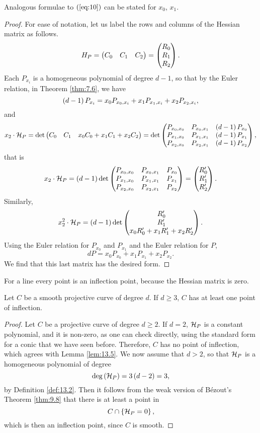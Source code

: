 \begin{remark}
Analogous formulae to $ \left( \ref{eq:10} \right) $ can be stated for $ x_0 $, $ x_1 $.
\end{remark}


\begin{proof}
For ease of notation, let us label the rows and columns of the Hessian matrix as follows.
$$ H_P = \begin{pmatrix} C_0 & C_1 & C_2 \end{pmatrix} = \begin{pmatrix} R_0 \\ R_1 \\ R_2 \end{pmatrix}.
$$
Each $ P_{x_i} $ is a homogeneous polynomial of degree $ d - 1 $, so that by the Euler relation, in Theorem \ref{thm:7.6}, we have
$$ \left( d - 1 \right)P_{x_i} = x_0P_{x_0, x_i} + x_1P_{x_1, x_i} + x_2P_{x_2, x_i}, $$
and
$$ x_2 \cdot \mathcal{H}_P = \det\begin{pmatrix} C_0 & C_1 & x_0C_0 + x_1C_1 + x_2C_2 \end{pmatrix} = \det\begin{pmatrix} P_{x_0, x_0} & P_{x_0, x_1} & \left( d - 1 \right)P_{x_0} \\ P_{x_1, x_0} & P_{x_1, x_1} & \left( d - 1 \right)P_{x_1} \\ P_{x_2, x_0} & P_{x_2, x_1} & \left( d - 1 \right)P_{x_2} \end{pmatrix}, $$
that is
$$ x_2 \cdot \mathcal{H}_P = \left( d - 1 \right)\det\begin{pmatrix} P_{x_0, x_0} & P_{x_0, x_1} & P_{x_0} \\ P_{x_1, x_0} & P_{x_1, x_1} & P_{x_1} \\ P_{x_2, x_0} & P_{x_2, x_1} & P_{x_2} \end{pmatrix} = \begin{pmatrix} R_0' \\ R_1' \\ R_2' \end{pmatrix}. $$
Similarly,
$$ x_2^2 \cdot \mathcal{H}_P = \left( d - 1 \right)\det\begin{pmatrix} R_0' \\ R_1' \\ x_0R_0' + x_1R_1' + x_2R_2' \end{pmatrix}. $$
Using the Euler relation for $ P_{x_0} $ and $ P_{x_1} $ and the Euler relation for $ P $,
$$ dP = x_0P_{x_0} + x_1P_{x_1} + x_2P_{x_2}. $$
We find that this last matrix has the desired form.
\end{proof}

\begin{note*}
For a line every point is an inflection point, because the Hessian matrix is zero.
\end{note*}

\begin{lemma}
\label{lem:13.5}
Let $ C $ be a smooth projective curve of degree $ d $. If $ d \ge 3 $, $ C $ has at least one point of inflection.
\end{lemma}

\begin{proof}
Let $ C $ be a projective curve of degree $ d \ge 2 $. If $ d = 2 $, $ \mathcal{H}_P $ is a constant polynomial, and it is non-zero, as one can check directly, using the standard form for a conic that we have seen before. Therefore, $ C $ has no point of inflection, which agrees with Lemma \ref{lem:13.5}. We now assume that $ d > 2 $, so that $ \mathcal{H}_P $ is a homogeneous polynomial of degree
$$ \deg\left( \mathcal{H}_P \right) = 3\left( d - 2 \right) = 3, $$
by Definition \ref{def:13.2}. Then it follows from the weak version of B\'ezout's Theorem \ref{thm:9.8} that there is at least a point in
$$ C \cap \left\{ \mathcal{H}_P = 0 \right\}, $$
which is then an inflection point, since $ C $ is smooth.
\end{proof}

